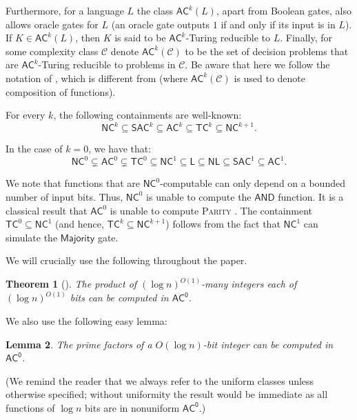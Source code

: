 \documentclass{article}
\newtheorem{theorem}{Theorem}\newtheorem{lemma}[theorem]{Lemma}\newtheorem{proposition}[theorem]{Proposition}\newtheorem{corollary}[theorem]{Corollary}\newtheorem{definition}[theorem]{Definition}\newtheorem{claim}[theorem]{Claim}\newtheorem{remark}[theorem]{Remark}\newtheorem{observation}[theorem]{Observation}\newtheorem{conjecture}[theorem]{Conjecture}\newtheorem{example}[theorem]{Example}
\newcommand{\algprobm}[1]{\textsc{#1}\xspace}
\newcommand*{\ComplexityClass}[1]{\ensuremath{\mathsf{#1}}\xspace}
\newcommand*{\LogSpace}{\ComplexityClass{L}}
\newcommand{\AC}{\ComplexityClass{AC}}
\newcommand{\SAC}{\ComplexityClass{SAC}}
\newcommand{\ACz}{\ComplexityClass{AC^0}}
\begin{document}
Furthermore, for a language $L$ the class $\AC^k(L)$, apart from Boolean gates, also allows oracle gates for $L$ (an oracle gate outputs $1$ if and only if its input is in $L$).
If $K\in \AC^k(L)$, then $K$ is said to be $\AC^k$-Turing reducible to $L$.
Finally, for some complexity class $\mathcal{C}$ denote $\AC^k(\mathcal{C})$ to be the set of decision problems that are $\AC^k$-Turing reducible to problems in $\mathcal{C}$. 
Be aware that here we follow the notation of \cite{VollmerText}, which is different from \cite{WagnerThesis,GrochowLevetWL} (where $\AC^k(\mathcal{C})$ is used to denote composition of functions).

For every $k$, the following containments are well-known:
\[
\mathsf{NC}^{k} \subseteq \SAC^k \subseteq  \AC^{k} \subseteq \mathsf{TC}^{k} \subseteq \mathsf{NC}^{k+1}.
\]

\noindent In the case of $k = 0$, we have that:
\[
\mathsf{NC}^{0} \subsetneq \AC^{0} \subsetneq \mathsf{TC}^{0} \subseteq \mathsf{NC}^{1} \subseteq \LogSpace \subseteq \mathsf{NL} \subseteq \mathsf{SAC}^{1} \subseteq \AC^{1}.
\]

\noindent We note that functions that are $\mathsf{NC}^{0}$-computable can only depend on a bounded number of input bits. Thus, $\mathsf{NC}^{0}$ is unable to compute the $\mathsf{AND}$ function. It is a classical result that $\AC^{0}$ is unable to compute \algprobm{Parity} \cite{Smolensky87algebraicmethods}. The containment $\mathsf{TC}^{0} \subseteq \mathsf{NC}^{1}$ (and hence, $\mathsf{TC}^{k} \subseteq \mathsf{NC}^{k+1}$) follows from the fact that $\mathsf{NC}^{1}$ can simulate the $\mathsf{Majority}$ gate. 

We will crucially use the following throughout the paper.

\begin{theorem}[{\cite[Theorem 5.1]{HESSE2002695}}] \label{lem:multiplication}
The product of $(\log n)^{O(1)}$-many integers each of $(\log n)^{O(1)}$ bits can be computed in $\ACz$.
\end{theorem}

We also use the following easy lemma:

\begin{lemma} \label{lem:factor}
The prime factors of a $O(\log n)$-bit integer can be computed in \ACz.
\end{lemma}

(We remind the reader that we always refer to the uniform classes unless otherwise specified; without uniformity the result would be immediate as all functions of $\log n$ bits are in nonuniform $\ACz$.)
\end{document}
